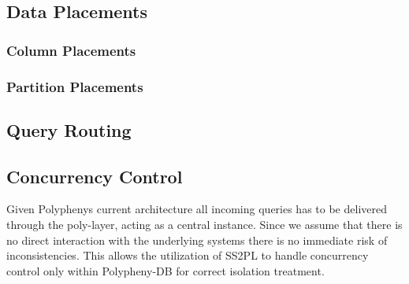 \subsection{Data Placements}
\subsubsection{Column Placements} 
\subsubsection{Partition Placements}

\subsection{Query Routing}

\subsection{Concurrency Control}

Given Polyphenys current architecture all incoming queries has to be delivered through the poly-layer, acting as a central instance.
Since we assume that there is no direct interaction with the underlying systems there is no immediate risk of inconsistencies. 
This allows the utilization of SS2PL to handle concurrency control only within Polypheny-DB for correct isolation treatment.

